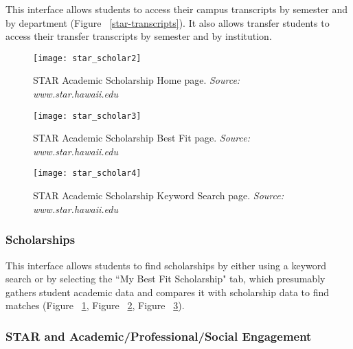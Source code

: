 This interface allows students to access their campus transcripts by semester and by department (Figure ~\ref{star-transcripts}). It also allows transfer students to access their transfer transcripts by semester and by institution. 
\begin{figure}[h]
\centering
\texttt{[image: star\_scholar2]}
\caption{STAR Academic Scholarship Home page. \textit{Source: www.star.hawaii.edu}}
\label{star-scholarship-home}
\end{figure}
\begin{figure}[h]
\centering
\texttt{[image: star\_scholar3]}
\caption{STAR Academic Scholarship Best Fit page. \textit{Source: www.star.hawaii.edu}}
\label{star-scholarship-best-fit}
\end{figure}
\begin{figure}[h]
\centering
\texttt{[image: star\_scholar4]}
\caption{STAR Academic Scholarship Keyword Search page. \textit{Source: www.star.hawaii.edu}}
\label{star-scholarship-keyword}
\end{figure}
\subsubsection{Scholarships}

This interface allows students to find scholarships by either using a keyword search or by selecting the ``My Best Fit Scholarship" tab, which presumably gathers student academic data and compares it with scholarship data to find matches (Figure ~\ref{star-scholarship-home}, Figure ~\ref{star-scholarship-best-fit}, Figure ~\ref{star-scholarship-keyword}).

\subsubsection{STAR and Academic/Professional/Social Engagement}

